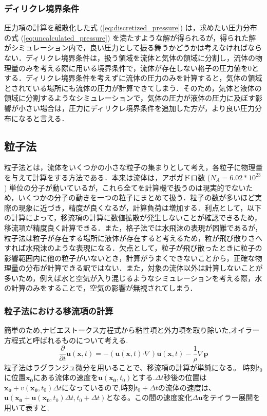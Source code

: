 \documentclass[a4j,12pt]{jreport}
\begin{document}
\subsubsection{ディリクレ境界条件} \label{subsec:Dirichlet}
圧力項の計算を離散化した式 (\ref{eq:discretized_pressure}) は，求めたい圧力分布の式 (\ref{eq:uncalculated_pressure}) を満たすような解が得られるが，得られた解がシミュレーション内で，良い圧力として振る舞うかどうかは考えなければならない．ディリクレ境界条件は，扱う領域を流体と気体の領域に分割し，流体の物理量のみを考える際に用いる境界条件で，流体が存在しない格子の圧力値を$0$とする．ディリクレ境界条件を考えずに流体の圧力のみを計算すると，気体の領域とされている場所にも流体の圧力が計算できてしまう．そのため，気体と液体の領域に分割するようなシミュレーションで，気体の圧力が液体の圧力に及ぼす影響が小さい場合は，圧力にディリクレ境界条件を追加した方が，より良い圧力分布になると言える．

\subsection{粒子法} \label{subsec:particle}
粒子法とは，流体をいくつかの小さな粒子の集まりとして考え，各粒子に物理量を与えて計算をする方法である．本来は流体は，アボガドロ数 ($N_A = 6.02*10^{23}$) 単位の分子が動いているが，これら全てを計算機で扱うのは現実的でないため，いくつかの分子の動きを一つの粒子にまとめて扱う．粒子の数が多いほど実際の現象に近づき，精度が良くなるが，計算負荷は増加する．利点として，以下の計算によって，移流項の計算に数値拡散が発生しないことが確認できるため，移流項が精度良く計算できる．また，格子法では水飛沫の表現が困難であるが，粒子法は粒子が存在する場所に液体が存在すると考えるため，粒が飛び散りさへすれば水飛沫のような表現になる．欠点として，粒子が飛び散ったときに粒子の影響範囲内に他の粒子がいないとき，計算がうまくできないことから，正確な物理量の分布が計算できる訳ではない．また，対象の流体以外は計算しないことが多いため，例えば水と空気が入り混じるようなシミュレーションを考える際，水の計算のみをすることで，空気の影響が無視されてしまう．
\subsubsection{粒子法における移流項の計算} \label{subsec:particleadvect}
簡単のため,ナビエストークス方程式から粘性項と外力項を取り除いた,オイラー方程式と呼ばれるものについて考える.
$$\frac{\partial}{\partial t}\bm{u} (\bm{x},t)  = - (\bm{u} (\bm{x},t) \boldsymbol{\cdot}\nabla) \bm{u} (\bm{x},t)  - \frac{1}{\rho}\nabla \bm{p}$$
粒子法はラグランジュ微分を用いることで、移流項の計算が単純になる。
時刻$t_0$に位置$\bm{x_0}$にある流体の速度を$\bm{u} (\bm{x_0},t_0) $とする.$\varDelta t$秒後の位置は$\bm{x_0}+v (\bm{x_0},t_0) \varDelta t$になっているので,時刻$t_0+\varDelta t$の流体の速度は、$\bm{u} (\bm{x_0}+\bm{u} (\bm{x_0},t_0) \varDelta t,t_0+\varDelta t) $となる。この間の速度変化$\varDelta \bm{u}$をテイラー展開を用いて表すと,
\end{document}
